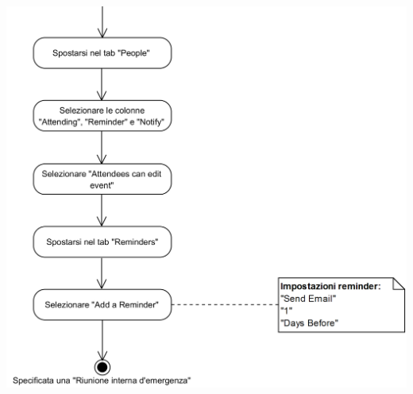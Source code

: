 \begin{center}
	\includegraphics[width=15cm]{./DiagrammiProcedure/RiunioneInternaDiEmergenza2.png}
\end{center}

